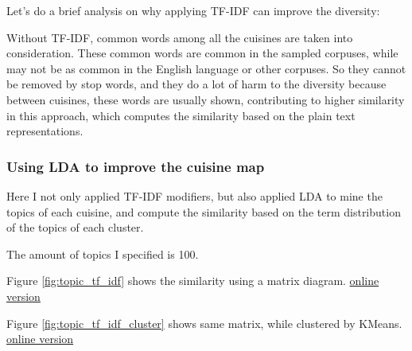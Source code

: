\documentclass[11pt]{article}
\begin{document}
Let's do a brief analysis on why applying TF-IDF can improve the diversity:

Without TF-IDF, common words among all the cuisines are taken into consideration. These common words are common in the sampled corpuses, while may not be as common in the English language or other corpuses. So they cannot be removed by stop words, and they do a lot of harm to the diversity because between cuisines, these words are usually shown, contributing to higher similarity in this approach, which computes the similarity based on the plain text representations.

\subsubsection{Using LDA to improve the cuisine map}
Here I not only applied TF-IDF modifiers, but also applied LDA to mine the topics of each cuisine, and compute the similarity based on the term distribution of the topics of each cluster.

The amount of topics I specified is 100.

\vspace{1em}
Figure \ref{fig:topic_tf_idf} shows the similarity using a matrix diagram.
\href{http://jiacheng-pan.me/standalone/datamining_capstone/task2/topic_tf_idf.html}{online version}

Figure \ref{fig:topic_tf_idf_cluster} shows same matrix, while clustered by KMeans.
\href{http://jiacheng-pan.me/standalone/datamining_capstone/task2/topic_tf_idf_cluster.html}{online version}
\end{document}
